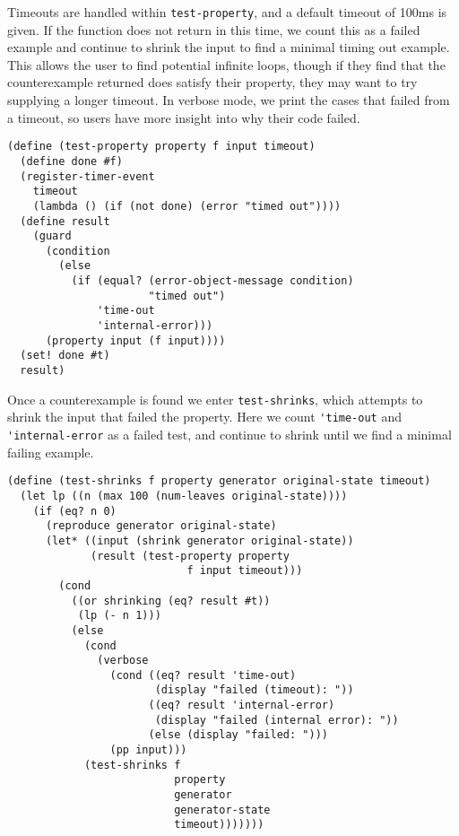 Timeouts are handled within \verb|test-property|, and a default timeout of 100ms is given. If the function does not return in this time, we count this as a failed example and continue to shrink the input to find a minimal timing out example. This allows the user to find potential infinite loops, though if they find that the counterexample returned does satisfy their property, they may want to try supplying a longer timeout. In verbose mode, we print the cases that failed from a timeout, so users have more insight into why their code failed.

\begin{lstlisting}
(define (test-property property f input timeout)
  (define done #f)
  (register-timer-event 
    timeout 
    (lambda () (if (not done) (error "timed out"))))
  (define result
    (guard
      (condition 
        (else 
          (if (equal? (error-object-message condition) 
                      "timed out")
              'time-out 
              'internal-error)))
      (property input (f input))))
  (set! done #t)
  result)
\end{lstlisting}

Once a counterexample is found we enter \verb|test-shrinks|, which attempts to shrink the input that failed the property. Here we count \verb|'time-out| and \verb|'internal-error| as a failed test, and continue to shrink until we find a minimal failing example.
\begin{lstlisting}
(define (test-shrinks f property generator original-state timeout)
  (let lp ((n (max 100 (num-leaves original-state))))
    (if (eq? n 0)
      (reproduce generator original-state)
      (let* ((input (shrink generator original-state))
             (result (test-property property 
                            f input timeout)))
        (cond
          ((or shrinking (eq? result #t))
           (lp (- n 1)))
          (else
            (cond
              (verbose
                (cond ((eq? result 'time-out) 
                       (display "failed (timeout): "))
                      ((eq? result 'internal-error)
                       (display "failed (internal error): "))
                      (else (display "failed: ")))
                (pp input)))
            (test-shrinks f 
                          property 
                          generator 
                          generator-state 
                          timeout)))))))
\end{lstlisting}
